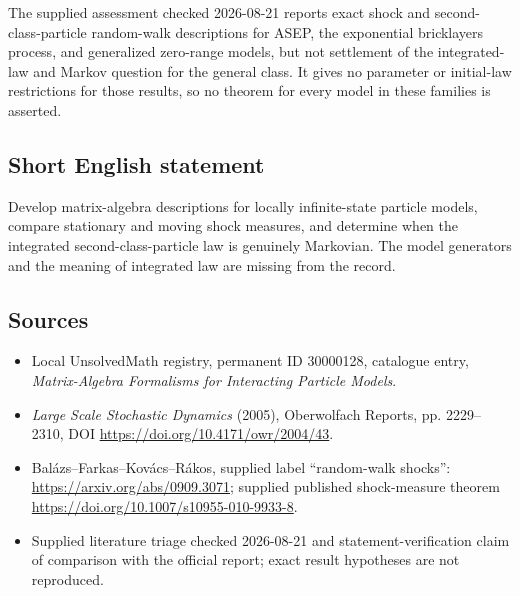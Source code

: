 \documentclass[11pt]{article}
\begin{document}
The supplied assessment checked 2026-08-21 reports exact shock and second-class-particle random-walk descriptions for ASEP, the exponential bricklayers process, and generalized zero-range models, but not settlement of the integrated-law and Markov question for the general class. It gives no parameter or initial-law restrictions for those results, so no theorem for every model in these families is asserted.
\subsection{Short English statement}
Develop matrix-algebra descriptions for locally infinite-state particle models, compare stationary and moving shock measures, and determine when the integrated second-class-particle law is genuinely Markovian. The model generators and the meaning of integrated law are missing from the record.
\subsection{Sources}
\begin{itemize}
\item Local UnsolvedMath registry, permanent ID 30000128, catalogue entry, \emph{Matrix-Algebra Formalisms for Interacting Particle Models}.
\item \emph{Large Scale Stochastic Dynamics} (2005), Oberwolfach Reports, pp. 2229--2310, DOI \url{https://doi.org/10.4171/owr/2004/43}.
\item Bal\'azs--Farkas--Kov\'acs--R\'akos, supplied label ``random-walk shocks'': \url{https://arxiv.org/abs/0909.3071}; supplied published shock-measure theorem \url{https://doi.org/10.1007/s10955-010-9933-8}.
\item Supplied literature triage checked 2026-08-21 and statement-verification claim of comparison with the official report; exact result hypotheses are not reproduced.
\end{itemize}
\end{document}
